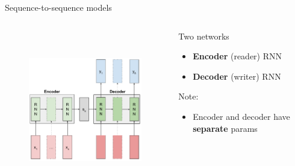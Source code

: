 \documentclass[12pt,aspectratio=169,handout]{beamer}
\begin{document}
\begin{frame}{Sequence-to-sequence models}

\begin{columns}[T] %
	\begin{column}{.59\textwidth}
	
		\begin{figure}[h]
		\includegraphics[height=7cm]{sequence_to_sequence_boxed.pdf}
	\end{figure}
	
	\end{column}
	\pause
	\begin{column}{.39\textwidth}
		\vspace{1cm}
		Two networks
		\begin{itemize}
			\item \textbf{Encoder} (reader) RNN
			\item \textbf{Decoder} (writer) RNN
		\end{itemize}
		\pause
		Note:
		\begin{itemize}
			\item Encoder and decoder have \textbf{separate} params
		\end{itemize}
	\end{column}
\end{columns}
\end{frame}
	
	
\end{document}
